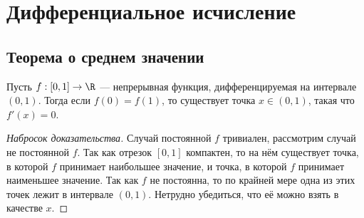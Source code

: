 \documentclass[
	extrafontsizes,
	11pt,
	hyphens,
]{memoir}
\begin{document}
\chapter{Дифференциальное исчисление}


\section{Теорема о среднем значении}

\begin{theorem}
Пусть \(f : [0,1] \to \R\) --- непрерывная функция, дифференцируемая на интервале \((0,1)\).
\label{thm:RolleMean}
Тогда если \(f(0) = f(1)\), то существует точка \(x \in (0,1)\), такая что \(f'(x) = 0\).
\end{theorem}



\begin{proof}[Набросок доказательства]
Случай постоянной \(f\) тривиален, рассмотрим случай не постоянной \(f\).
Так как отрезок \([0,1]\) компактен, то на нём существует точка, в которой \(f\) принимает наибольшее значение, и точка, в которой \(f\) принимает наименьшее значение.
Так как \(f\) не постоянна, то по крайней мере одна из этих точек лежит в интервале \((0,1)\).
Нетрудно убедиться, что её можно взять в качестве \(x\).
\end{proof}
\end{document}
